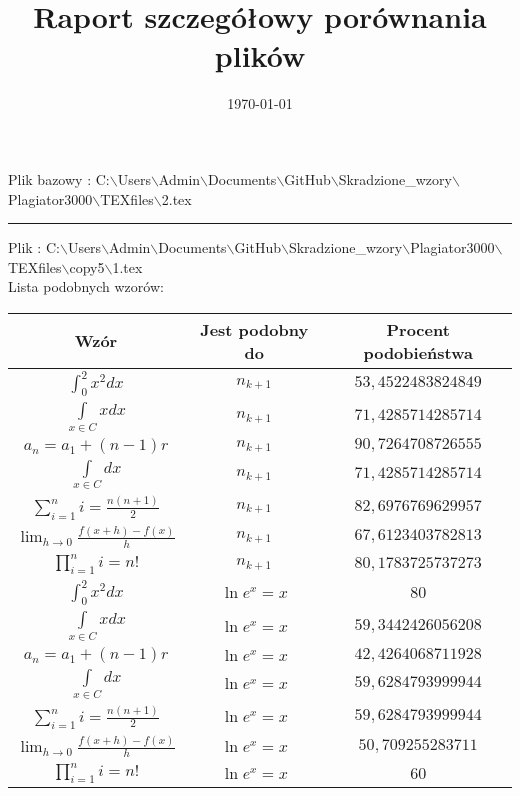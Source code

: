\documentclass{article}
\begin{document}
\title{\huge\bfseries Raport szczegółowy porównania plików }
\date{\today}
\maketitle
\begin{flushleft}
Plik bazowy : C:$\backslash$Users$\backslash$Admin$\backslash$Documents$\backslash$GitHub$\backslash$Skradzione\_wzory$\backslash$Plagiator3000$\backslash$TEXfiles$\backslash$2.tex
\end{flushleft}
\hrule
\begin{flushleft}
Plik : C:$\backslash$Users$\backslash$Admin$\backslash$Documents$\backslash$GitHub$\backslash$Skradzione\_wzory$\backslash$Plagiator3000$\backslash$TEXfiles$\backslash$copy5$\backslash$1.tex\\ 
Lista podobnych wzorów: \\ 
\begin{longtable}{|c|c|c|} 
 \hline 
 Wzór & Jest podobny do & Procent podobieństwa \\ \hline  
$\int _0^2x^2dx$ & $n_{k+1}$ & $53,4522483824849$ \\ \hline 
$\int \limits_{x\in C}xdx$ & $n_{k+1}$ & $71,4285714285714$ \\ \hline 
$a_{n}=a_{1}+(n-1)r$ & $n_{k+1}$ & $90,7264708726555$ \\ \hline 
$\int \limits_{x\in C}dx$ & $n_{k+1}$ & $71,4285714285714$ \\ \hline 
$\sum_{i=1}^{n}i=\frac{n(n+1)}{2}$ & $n_{k+1}$ & $82,6976769629957$ \\ \hline 
$\lim_{h\to0}\frac{f(x+h)-f(x)}{h}$ & $n_{k+1}$ & $67,6123403782813$ \\ \hline 
$\prod_{i=1}^ni=n!$ & $n_{k+1}$ & $80,1783725737273$ \\ \hline 
$\int _0^2x^2dx$ & $\ln e^x=x$ & $80$ \\ \hline 
$\int \limits_{x\in C}xdx$ & $\ln e^x=x$ & $59,3442426056208$ \\ \hline 
$a_{n}=a_{1}+(n-1)r$ & $\ln e^x=x$ & $42,4264068711928$ \\ \hline 
$\int \limits_{x\in C}dx$ & $\ln e^x=x$ & $59,6284793999944$ \\ \hline 
$\sum_{i=1}^{n}i=\frac{n(n+1)}{2}$ & $\ln e^x=x$ & $59,6284793999944$ \\ \hline 
$\lim_{h\to0}\frac{f(x+h)-f(x)}{h}$ & $\ln e^x=x$ & $50,709255283711$ \\ \hline 
$\prod_{i=1}^ni=n!$ & $\ln e^x=x$ & $60$ \\ \hline 

\end{longtable}
\end{flushleft}
\end{document}
